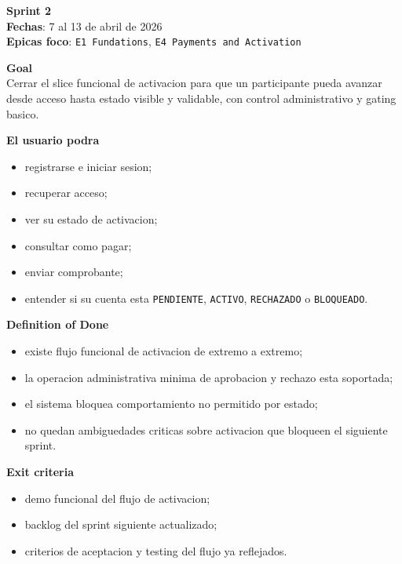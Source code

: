 \begin{docnote}
\textbf{Sprint 2}\\
\textbf{Fechas}: 7 al 13 de abril de 2026\\
\textbf{Epicas foco}: \texttt{E1 Fundations}, \texttt{E4 Payments and Activation}

\textbf{Goal}\\
Cerrar el slice funcional de activacion para que un participante pueda avanzar desde acceso hasta estado visible y validable, con control administrativo y gating basico.

\textbf{El usuario podra}\\
\begin{itemize}
  \item registrarse e iniciar sesion;
  \item recuperar acceso;
  \item ver su estado de activacion;
  \item consultar como pagar;
  \item enviar comprobante;
  \item entender si su cuenta esta \texttt{PENDIENTE}, \texttt{ACTIVO}, \texttt{RECHAZADO} o \texttt{BLOQUEADO}.
\end{itemize}

\textbf{Definition of Done}\\
\begin{itemize}
  \item existe flujo funcional de activacion de extremo a extremo;
  \item la operacion administrativa minima de aprobacion y rechazo esta soportada;
  \item el sistema bloquea comportamiento no permitido por estado;
  \item no quedan ambiguedades criticas sobre activacion que bloqueen el siguiente sprint.
\end{itemize}

\textbf{Exit criteria}\\
\begin{itemize}
  \item demo funcional del flujo de activacion;
  \item backlog del sprint siguiente actualizado;
  \item criterios de aceptacion y testing del flujo ya reflejados.
\end{itemize}
\end{docnote}

